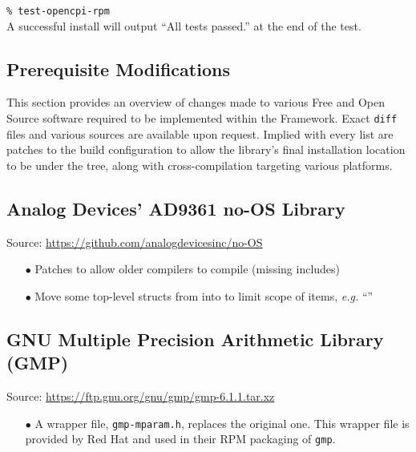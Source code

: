 \verb+% test-opencpi-rpm+\\

A successful install will output ``All tests passed.'' at the end of the test.

\newpage
\begin{appendices}
\appendix
\section{Prerequisite Modifications}
This section provides an overview of changes made to various Free and Open Source software required to be implemented within the Framework. Exact \texttt{diff} files and various sources are available upon request. Implied with every list are patches to the build configuration to allow the library's final installation location to be under the  tree, along with cross-compilation targeting various platforms.

\subsection{Analog Devices' AD9361 no-OS Library}
\label{App:ad9361}
Source: \url{https://github.com/analogdevicesinc/no-OS}
\begin{enumerate}
\item[$\bullet$] Patches to allow older compilers to compile (missing  includes)
\item[$\bullet$] Move some top-level structs from  into  to limit scope of items, \textit{e.g.} ``''
\end{enumerate}

\subsection{GNU Multiple Precision Arithmetic Library (GMP)}
\label{App:gmp}
Source: \url{https://ftp.gnu.org/gnu/gmp/gmp-6.1.1.tar.xz}
\begin{enumerate}
\item[$\bullet$] A wrapper file, \verb+gmp-mparam.h+, replaces the original one. This wrapper file is provided by Red Hat and used in their RPM packaging of \texttt{gmp}.
\end{enumerate}


\end{appendices}
